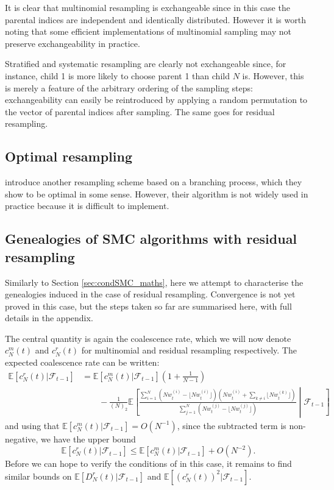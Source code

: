 \documentclass[fleqn]{article}
\theoremstyle{definition}
\newcommand{\E}{\mathbb{E}}
\newcommand{\F}{\mathcal{F}_{t-1}}
\newcommand{\wt}[2][t]{w_{#1}^{(#2)}}
\begin{document}
It is clear that multinomial resampling is exchangeable since in this case the parental indices are independent and identically distributed. However it is worth noting that some efficient implementations of multinomial sampling may not preserve exchangeability in practice.

Stratified and systematic resampling are clearly not exchangeable since, for instance, child 1 is more likely to choose parent 1 than child $N$ is. However, this is merely a feature of the arbitrary ordering of the sampling steps: exchangeability can easily be reintroduced by applying a random permutation to the vector of parental indices after sampling.
The same goes for residual resampling.

\subsection{Optimal resampling}
\citet{crisan1999} introduce another resampling scheme based on a branching process, which they show to be optimal in some sense. However, their algorithm is not widely used in practice because it is difficult to implement.

\subsection{Genealogies of SMC algorithms with residual resampling}
Similarly to Section \ref{sec:condSMC_maths}, here we attempt to characterise the genealogies induced in the case of residual resampling. Convergence is not yet proved in this case, but the steps taken so far are summarised here, with full details in the appendix.

The central quantity is again the coalescence rate, which we will now denote $c_N^m(t)$ and $c_N^r(t)$ for multinomial and residual resampling respectively.
The expected coalescence rate can be written:
\begin{align*}
\E[c^r_N(t) |\F]
&= \E[c^{m}_N(t) |\F] \left( 1 + \frac{1}{N-1} \right) \\
&\qquad- \frac{1}{(N)_2}  \E\left[ \frac{\sum_{i=1}^{N} \left(N\wt{i} - \lfloor N\wt{i} \rfloor \right) \left( N\wt{i} + \sum_{k\neq i} \lfloor N\wt{k} \rfloor \right) }{\sum_{j=1}^{N} \left(N\wt{j} - \lfloor N\wt{j}\rfloor\right)} \middle|\F \right]  
\end{align*}
and using that $\E[c^{m}_N(t) |\F] = O(N^{-1})$, since the subtracted term is non-negative, we have the upper bound
\begin{equation}\label{eq:residual_coalrate}
\E[c^r_N(t) |\F] \leq \E[c^m_N(t) |\F] + O(N^{-2}).
\end{equation}
Before we can hope to verify the conditions of \citet[Theorem 1]{koskela2018} in this case, it remains to find similar bounds on $\E[D^r_N(t) |\F]$ and $\E[(c^r_N(t))^2 |\F]$.
\end{document}
